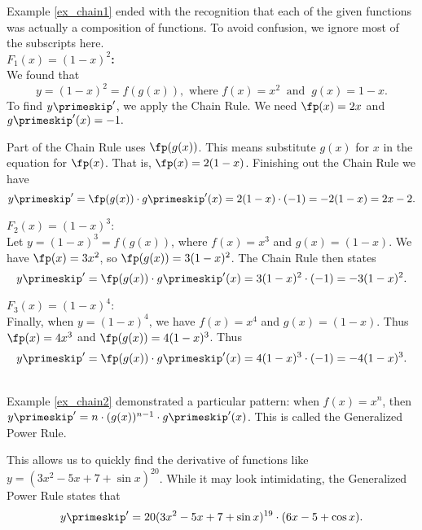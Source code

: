 {Example \ref{ex_chain1} ended with the recognition that each of the given functions was actually a composition of functions. To avoid confusion, we ignore most of the subscripts here. \\ %

\noindent\textbf{$F_1(x) = (1-x)^2$:}\\

We found that 
\[
y=(1-x)^2 = f(g(x)), \text{ where } f(x) = x^2\ \text{ and }\ g(x) = 1-x.
\]
To find $y\primeskip'$, we apply the Chain Rule. We need $\fp(x)=2x$ and $g\primeskip'(x)=-1.$

Part of the Chain Rule uses $\fp(g(x))$. This means substitute $g(x)$ for $x$ in the equation for $\fp(x)$. That is, $\fp(x) = 2(1-x)$.  Finishing out the Chain Rule we have 
\[
y\primeskip' = \fp(g(x))\cdot g\primeskip'(x) = 2(1-x)\cdot (-1) = -2(1-x)= 2x-2.
\]

\noindent $F_2(x) = (1-x)^3$:\\

Let $y = (1-x)^3 = f(g(x))$, where $f(x) = x^3$ and $g(x) = (1-x)$. We have $\fp(x) = 3x^2$, so $\fp(g(x)) = 3(1-x)^2$. The Chain Rule then states 
\[
y\primeskip' = \fp(g(x))\cdot g\primeskip'(x) = 3(1-x)^2\cdot(-1) = -3(1-x)^2.
\]

\enlargethispage{2\baselineskip}%
\noindent $F_3(x) = (1-x)^4$:\\

Finally, when $y = (1-x)^4$, we have $f(x)= x^4$ and $g(x) = (1-x)$. Thus $\fp(x) = 4x^3$ and $\fp(g(x)) = 4(1-x)^3$. Thus 
\[
y\primeskip' = \fp(g(x))\cdot g\primeskip'(x) = 4(1-x)^3\cdot (-1) = -4(1-x)^3.
\]
\baselineskip
}\\

Example \ref{ex_chain2} demonstrated a particular pattern: when $f(x)=x^n$, then $y\primeskip' =n\cdot (g(x))^{n-1}\cdot g\primeskip'(x)$. This  is called the Generalized Power Rule.\\



This allows us to quickly find the derivative of functions like $y = (3x^2-5x+7+\sin x)^{20}$. While it may look intimidating, the Generalized Power Rule states that 
\[
y\primeskip' = 20(3x^2-5x+7+\sin x)^{19}\cdot (6x-5+\cos x).
\]

